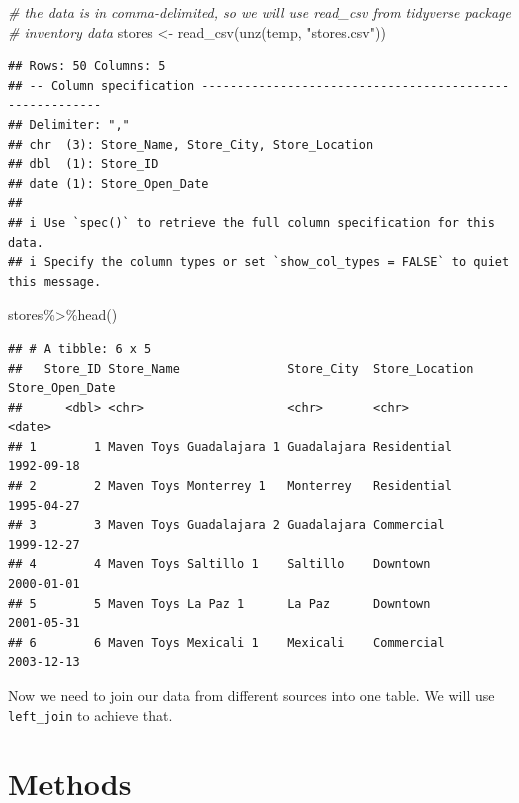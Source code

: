\documentclass[
]{book}
\newenvironment{Shaded}{\begin{snugshade}}{\end{snugshade}}
\newcommand{\CommentTok}[1]{\textcolor[rgb]{0.56,0.35,0.01}{\textit{#1}}}
\newcommand{\FunctionTok}[1]{\textcolor[rgb]{0.00,0.00,0.00}{#1}}
\newcommand{\NormalTok}[1]{#1}
\newcommand{\OtherTok}[1]{\textcolor[rgb]{0.56,0.35,0.01}{#1}}
\newcommand{\SpecialCharTok}[1]{\textcolor[rgb]{0.00,0.00,0.00}{#1}}
\newcommand{\StringTok}[1]{\textcolor[rgb]{0.31,0.60,0.02}{#1}}
\begin{document}
\begin{Shaded}
\begin{Highlighting}[]
\CommentTok{\# the data is in comma{-}delimited, so we will use \textasciigrave{}read\_csv\textasciigrave{} from \textasciigrave{}tidyverse\textasciigrave{} package}
\CommentTok{\# inventory data}
\NormalTok{stores }\OtherTok{\textless{}{-}} \FunctionTok{read\_csv}\NormalTok{(}\FunctionTok{unz}\NormalTok{(temp, }\StringTok{"stores.csv"}\NormalTok{))}
\end{Highlighting}
\end{Shaded}

\begin{verbatim}
## Rows: 50 Columns: 5
## -- Column specification --------------------------------------------------------
## Delimiter: ","
## chr  (3): Store_Name, Store_City, Store_Location
## dbl  (1): Store_ID
## date (1): Store_Open_Date
## 
## i Use `spec()` to retrieve the full column specification for this data.
## i Specify the column types or set `show_col_types = FALSE` to quiet this message.
\end{verbatim}

\begin{Shaded}
\begin{Highlighting}[]
\NormalTok{stores}\SpecialCharTok{\%\textgreater{}\%}\FunctionTok{head}\NormalTok{()}
\end{Highlighting}
\end{Shaded}

\begin{verbatim}
## # A tibble: 6 x 5
##   Store_ID Store_Name               Store_City  Store_Location Store_Open_Date
##      <dbl> <chr>                    <chr>       <chr>          <date>         
## 1        1 Maven Toys Guadalajara 1 Guadalajara Residential    1992-09-18     
## 2        2 Maven Toys Monterrey 1   Monterrey   Residential    1995-04-27     
## 3        3 Maven Toys Guadalajara 2 Guadalajara Commercial     1999-12-27     
## 4        4 Maven Toys Saltillo 1    Saltillo    Downtown       2000-01-01     
## 5        5 Maven Toys La Paz 1      La Paz      Downtown       2001-05-31     
## 6        6 Maven Toys Mexicali 1    Mexicali    Commercial     2003-12-13
\end{verbatim}

Now we need to join our data from different sources into one table.
We will use \texttt{left\_join} to achieve that.

\hypertarget{methods}{%
\chapter{Methods}\label{methods}}
\end{document}
